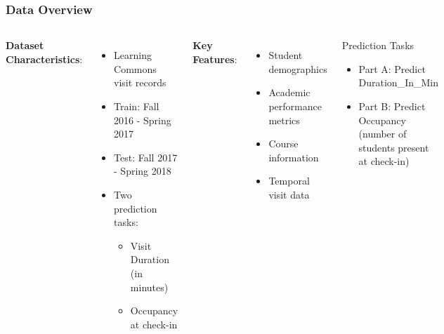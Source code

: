 \documentclass{beamer}
\begin{document}
\begin{frame}
\frametitle{Data Overview}
    \begin{columns}
        \textbf{Dataset Characteristics}:
            \begin{itemize}
            \item Learning Commons visit records
            \item Train: Fall 2016 - Spring 2017
            \item Test: Fall 2017 - Spring 2018
            \item Two prediction tasks:
                \begin{itemize}
                \item Visit Duration (in minutes)
                \item Occupancy at check-in
                \end{itemize}
            \end{itemize}
            
        \textbf{Key Features}:
            \begin{itemize}
            \item Student demographics
            \item Academic performance metrics
            \item Course information
            \item Temporal visit data
            \end{itemize}
                
        \begin{alertblock}{Prediction Tasks}
            \begin{itemize}
            \item Part A: Predict Duration\_In\_Min
            \item Part B: Predict Occupancy (number of students present at check-in)
            \end{itemize}
        \end{alertblock}
    \end{columns}
\end{frame}
\end{document}
